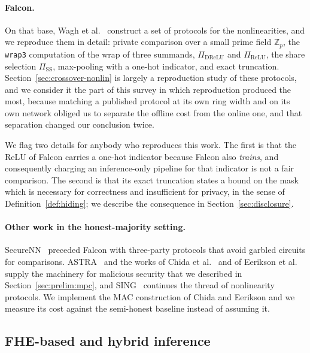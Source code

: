 \documentclass[11pt]{article}
\newcommand{\bt}[1]{\texttt{#1}}
\newcommand{\Z}{\mathbb{Z}}
\newcommand{\ReLU}{\ensuremath{\mathrm{ReLU}}}
\begin{document}
\paragraph{Falcon.} On that base, Wagh et al.~\cite{Falcon} construct a set of protocols for
the nonlinearities, and we reproduce them in detail: private comparison over a small prime field
$\Z_p$, the \bt{wrap3} computation of the wrap of three summands, $\Pi_{\mathrm{DReLU}}$ and
$\Pi_{\mathrm{ReLU}}$, the share selection $\Pi_{\mathrm{SS}}$, max-pooling with a one-hot
indicator, and exact truncation. Section~\ref{sec:crossover-nonlin} is largely a reproduction
study of these protocols, and we consider it the part of this survey in which reproduction
produced the most, because matching a published protocol at its own ring width and on its own
network obliged us to separate the offline cost from the online one, and that separation changed
our conclusion twice.

We flag two details for anybody who reproduces this work. The first is that the $\ReLU$ of
Falcon carries a one-hot indicator because Falcon also \emph{trains}, and consequently charging
an inference-only pipeline for that indicator is not a fair comparison. The second is that its
exact truncation states a bound on the mask which is necessary for correctness and insufficient
for privacy, in the sense of Definition~\ref{def:hiding}; we describe the consequence in
Section~\ref{sec:disclosure}.

\paragraph{Other work in the honest-majority setting.} SecureNN~\cite{SecureNN} preceded
Falcon with three-party protocols that avoid garbled circuits for comparisons.
ASTRA~\cite{ASTRA} and the works of Chida et al.~\cite{Chida} and of Eerikson et
al.~\cite{Eerikson} supply the machinery for malicious security that we described in
Section~\ref{sec:prelim:mpc}, and SING~\cite{SING} continues the thread of nonlinearity
protocols. We implement the MAC construction of Chida and Eerikson and we measure its cost
against the semi-honest baseline instead of assuming it.

\subsection{FHE-based and hybrid inference}
\label{sec:related:fhe}
\end{document}
